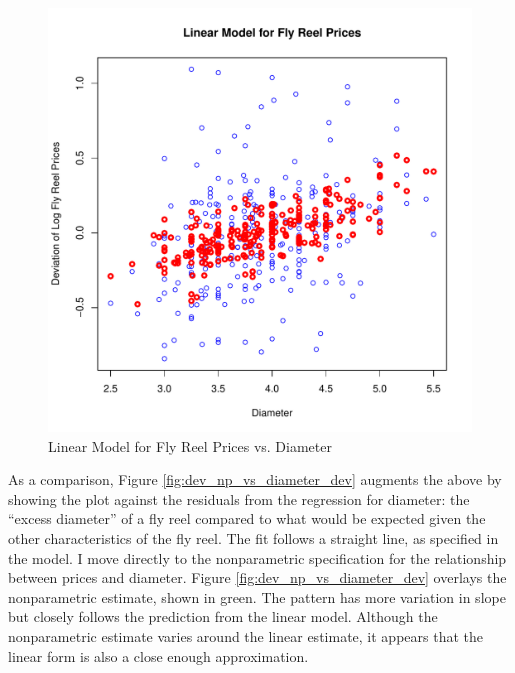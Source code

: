 \documentclass[11pt]{paper}
\begin{document}
\begin{figure}[h!]
  \centering
  \includegraphics[scale = 0.5, keepaspectratio=true]{../Figures/dev_vs_diameter}
  \caption{Linear Model for Fly Reel Prices vs. Diameter} \label{fig:dev_vs_diameter}
\end{figure}



\pagebreak
As a comparison, Figure \ref{fig:dev_np_vs_diameter_dev} 
augments the above by showing the plot against the 
residuals from the regression for 
diameter:
the ``excess diameter'' of a fly reel 
compared to what would be 
expected given the other characteristics of the fly reel. 
The fit follows a straight line, as specified in the model. 
% 
I move directly to the nonparametric specification for 
the relationship between prices and 
diameter.
Figure \ref{fig:dev_np_vs_diameter_dev} 
overlays the nonparametric estimate, shown in green. 
The pattern has more variation in slope but 
closely follows the prediction from the linear model. 
Although the nonparametric estimate varies around the linear estimate,
it appears that the linear form
is also a close enough approximation.
\end{document}

